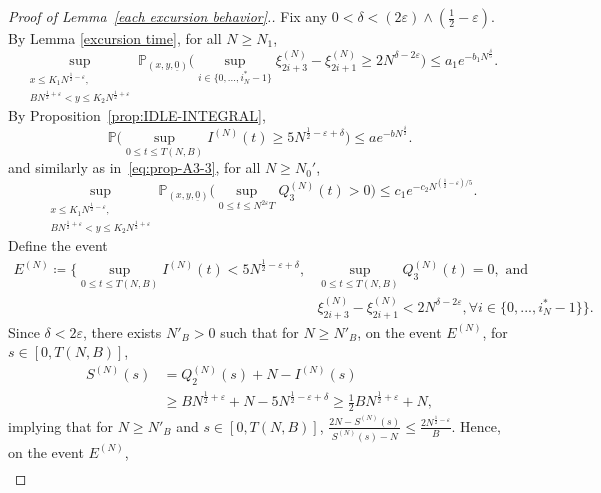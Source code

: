 \documentclass[11pt, reqno]{article}
\numberwithin{equation}{section}
\numberwithin{theorem}{section}
\begin{document}
\begin{appendix}
\begin{proof}[Proof of Lemma~\ref{each excursion behavior}.]
Fix any $0<\delta< (2\varepsilon) \wedge \left(\frac{1}{2} - \varepsilon\right)$. 
By Lemma \ref{excursion time}, for all $N\geq N_1$,
\begin{equation}\label{eq:A2-1}
    \sup_{\substack{x\leq K_1N^{\frac{1}{2} - \varepsilon},\\ BN^{\frac{1}{2} + \varepsilon} <y\leq K_2N^{\frac{1}{2} + \varepsilon}}}\mathbb{P}_{(x,y, \underline{0})}\Big( \sup_{i\in\{0,...,i^*_N-1\}}\xi^{(N)}_{2i+3}-\xi^{(N)}_{2i+1}\geq 2 N^{\delta-2\varepsilon}\Big)\leq a_1e^{-b_1N^{\frac{\delta}{5}}}.
\end{equation}
By Proposition~\ref{prop:IDLE-INTEGRAL},
\begin{equation}\label{eq:A2-2}
    \mathbb{P}\big(\sup_{0\leq t\leq T(N,B)}I^{(N)}(t)\geq 5 N^{\frac{1}{2}-\varepsilon+\delta}\big)\leq ae^{-bN^{\frac{\delta}{2}}}.
\end{equation}
and similarly as in~\eqref{eq:prop-A3-3}, for all $N\geq N_0'$,
\begin{equation}\label{eq:lem4-3}
    \sup_{\substack{x\leq K_1N^{\frac{1}{2} - \varepsilon},\\ BN^{\frac{1}{2} + \varepsilon} <y\leq K_2N^{\frac{1}{2} + \varepsilon}}}\mathbb{P}_{(x,y, \underline{0})}\Big(\sup_{0\leq t\leq N^{2\varepsilon}T}Q^{(N)}_3(t)>0\Big)\leq c_1e^{-c_2N^{(\frac{1}{2}-\varepsilon)/5}}.
\end{equation}
Define the event 
\begin{align*}
    E^{(N)}\coloneqq\Big\{\sup_{0\leq t\leq T(N,B)} I^{(N)}(t)< 5 N^{\frac{1}{2}-\varepsilon+\delta}, &\sup_{0\leq t\leq T(N,B)}Q^{(N)}_3(t)=0,\text { and }\\
    &\xi^{(N)}_{2i+3}-\xi^{(N)}_{2i+1}< 2 N^{\delta-2\varepsilon},\forall i\in\{0,...,i^*_N-1\}\Big\}.
\end{align*}
Since $\delta<2\varepsilon$,
there exists $N'_B>0$ such that for $N\geq N'_B$, on the event $E^{(N)}$, for $s\in [0,T(N,B)]$,
\begin{align*}
    S^{(N)}(s)&=Q^{(N)}_2(s)+N-I^{(N)}(s)\\
    &\geq BN^{\frac{1}{2}+\varepsilon}+N- 5 N^{\frac{1}{2}-\varepsilon+\delta}\geq \frac{1}{2}BN^{\frac{1}{2}+\varepsilon}+N,
\end{align*}
implying that for $N\geq N'_B$ and $s\in [0,T(N,B)]$, 
$
    \frac{2N-S^{(N)}(s)}{S^{(N)}(s)-N}\leq \frac{2N^{\frac{1}{2}-\varepsilon}}{B}.
$
Hence, on the event $E^{(N)}$,
\begin{align*}

\end{align*}
\end{proof}
\end{appendix}
\end{document}
